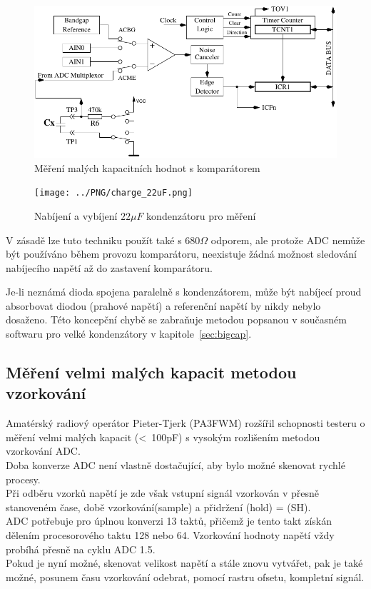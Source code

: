 \begin{figure}[H]
\centering
\includegraphics[]{../FIG/Comparat.pdf}
\caption{Měření malých kapacitních hodnot s komparátorem}
\label{fig:comparat}
\end{figure}

\begin{figure}[H]
  \centering
    \texttt{[image: ../PNG/charge\_22uF.png]}
  \caption{Nabíjení a vybíjení \(22\mu F\) kondenzátoru pro měření}
  \label{pic:c22uF}
\end{figure}


V zásadě lze tuto techniku použít také s \(680\Omega\) odporem,
ale protože ADC nemůže být používáno během provozu komparátoru, neexistuje žádná
možnost sledování nabíjecího napětí až do zastavení komparátoru.

Je-li neznámá dioda spojena paralelně s kondenzátorem, může být nabíjecí proud
absorbovat diodou (prahové napětí) a referenční napětí by nikdy nebylo dosaženo.
Této koncepční chybě se zabraňuje metodou popsanou v současném softwaru pro velké kondenzátory
v kapitole~\ref{sec:bigcap}.

\subsection{Měření velmi malých kapacit metodou vzorkování}
Amatérský radiový operátor Pieter-Tjerk (PA3FWM) rozšířil schopnosti testeru o měření velmi malých kapacit (\textless~100pF) s vysokým rozlišením metodou vzorkování ADC.\\
Doba konverze ADC není vlastně dostačující, aby bylo možné skenovat rychlé procesy.\\
Při odběru vzorků napětí je zde však vstupní signál vzorkován v přesně stanoveném čase,
době vzorkování(sample) a přidržení (hold) = (SH).\\ ADC potřebuje pro úplnou konverzi 13 taktů,
přičemž je tento takt získán dělením procesorového taktu 128 nebo 64.
Vzorkování hodnoty napětí vždy probíhá přesně na cyklu ADC 1.5.\\
Pokud je nyní možné, skenovat velikost napětí a stále znovu vytvářet, pak je také možné,
posunem času vzorkování odebrat, pomocí rastru ofsetu, kompletní signál.

